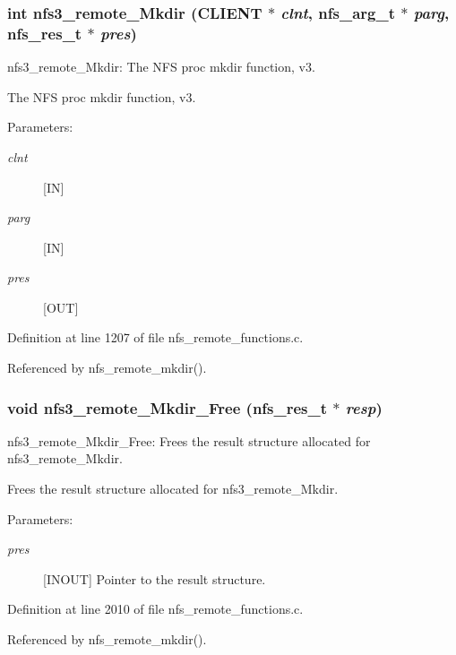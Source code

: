 \subsubsection{\setlength{\rightskip}{0pt plus 5cm}int nfs3\_\-remote\_\-Mkdir (CLIENT $\ast$ {\em clnt}, nfs\_\-arg\_\-t $\ast$ {\em parg}, nfs\_\-res\_\-t $\ast$ {\em pres})}\label{group__NFSprocs_ga30}


nfs3\_\-remote\_\-Mkdir: The NFS proc mkdir function, v3.

The NFS proc mkdir function, v3.

\begin{Desc}
\item[Parameters:]
\begin{description}
\item[{\em clnt}][IN] \item[{\em parg}][IN] \item[{\em pres}][OUT] \end{description}
\end{Desc}


Definition at line 1207 of file nfs\_\-remote\_\-functions.c.

Referenced by nfs\_\-remote\_\-mkdir().
\subsubsection{\setlength{\rightskip}{0pt plus 5cm}void nfs3\_\-remote\_\-Mkdir\_\-Free (nfs\_\-res\_\-t $\ast$ {\em resp})}\label{group__NFSprocs_ga80}


nfs3\_\-remote\_\-Mkdir\_\-Free: Frees the result structure allocated for nfs3\_\-remote\_\-Mkdir.

Frees the result structure allocated for nfs3\_\-remote\_\-Mkdir.

\begin{Desc}
\item[Parameters:]
\begin{description}
\item[{\em pres}][INOUT] Pointer to the result structure. \end{description}
\end{Desc}


Definition at line 2010 of file nfs\_\-remote\_\-functions.c.

Referenced by nfs\_\-remote\_\-mkdir().
